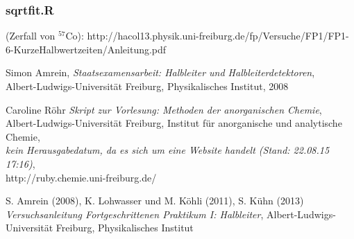 \documentclass[12pt]{article}
\newcommand{\gra}[3][0.7]{
	\begin{minipage}[h!]{\textwidth}
		\centering
		\texttt{[image: figures/\#2.png]}
		\captionof{figure}{#3}
	\end{minipage}
	\vskip 30 pt
	}
\begin{document}
\subsubsection{sqrtfit.R}\label{srcsqrtfit}




%


%



\newpage
\listoffigures


\newpage
\thispagestyle{empty}
\begin{thebibliography}{9}

 (Zerfall von $^{57}$Co): http://hacol13.physik.uni-freiburg.de/fp/Versuche/FP1/FP1-6-KurzeHalbwertzeiten/Anleitung.pdf
  
  	Simon Amrein,
  	\emph{Staatsexamensarbeit: Halbleiter und Halbleiterdetektoren},\\
  	Albert-Ludwigs-Universität Freiburg,
  	Physikalisches Institut,
  	2008

	Caroline Röhr
	\emph{Skript zur Vorlesung: Methoden der anorganischen Chemie},\\
	Albert-Ludwigs-Universität Freiburg,
	Institut für anorganische und analytische Chemie,\\
	\emph{kein Herausgabedatum, da es sich um eine Website handelt (Stand: 22.08.15 17:16)},\\
	http://ruby.chemie.uni-freiburg.de/

  	S. Amrein (2008), K. Lohwasser und M. Köhli (2011), S. Kühn (2013)
  	\emph{Versuchsanleitung Fortgeschrittenen Praktikum I: Halbleiter},
  	Albert-Ludwigs-Universität Freiburg,
  	Physikalisches Institut
  
  

\end{thebibliography}
\end{document}
